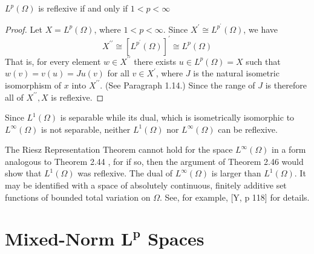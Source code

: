 \begin{theorem}
  $L^p(\Omega)$ is reflexive if and only if $1<p<\infty$
\end{theorem}

\begin{proof}
  Let $X=L^p(\Omega)$, where $1<p<\infty$. Since $X^{\prime} \cong L^{p^{\prime}}(\Omega)$, we have
  \[
  X^{\prime \prime} \cong\left[L^{p^{\prime}}(\Omega)\right]^{\prime} \cong L^p(\Omega)
  \]
  That is, for every element $w \in X^{\prime \prime}$ there exists $u \in L^p(\Omega)=X$ such that $w(v)=v(u)=J u(v)$ for all $v \in X^{\prime}$, where $J$ is the natural isometric isomorphism of $x$ into $X^{\prime \prime}$. (See Paragraph 1.14.) Since the range of $J$ is therefore all of $X^{\prime \prime}, X$ is reflexive.
\end{proof}

Since $L^1(\Omega)$ is separable while its dual, which is isometrically isomorphic to $L^{\infty}(\Omega)$ is not separable, neither $L^1(\Omega)$ nor $L^{\infty}(\Omega)$ can be reflexive.

\begin{para}
  The Riesz Representation Theorem cannot hold for the space $L^{\infty}(\Omega)$ in a form analogous to Theorem 2.44 , for if so, then the argument of Theorem 2.46 would show that $L^1(\Omega)$ was reflexive. The dual of $L^{\infty}(\Omega)$ is larger than $L^1(\Omega)$. It may be identified with a space of absolutely continuous, finitely additive set functions of bounded total variation on $\Omega$. See, for example, [Y, p 118] for details.
\end{para}


\section[Mixed-Norm $L^p$ Spaces]{Mixed-Norm $\bm{L^p}$ Spaces}

